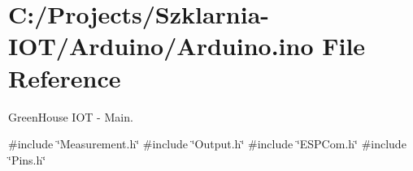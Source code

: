 \hypertarget{_arduino_8ino}{}\section{C\+:/\+Projects/\+Szklarnia-\/\+I\+O\+T/\+Arduino/\+Arduino.ino File Reference}
\label{_arduino_8ino}


Green\+House I\+OT -\/ Main.  


{\ttfamily \#include \char`\"{}Measurement.\+h\char`\"{}}\newline
{\ttfamily \#include \char`\"{}Output.\+h\char`\"{}}\newline
{\ttfamily \#include \char`\"{}E\+S\+P\+Com.\+h\char`\"{}}\newline
{\ttfamily \#include \char`\"{}Pins.\+h\char`\"{}}\newline
